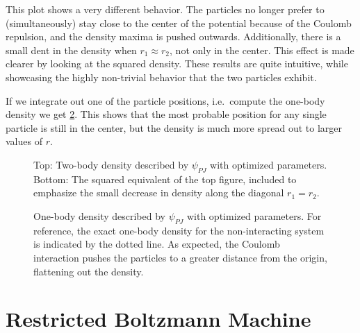 \documentclass[Thesis.tex]{subfiles}
\begin{document}
This plot shows a very different behavior. The particles no longer prefer to
(simultaneously) stay close to the center of the potential because of the Coulomb repulsion, and
the density maxima is pushed outwards. Additionally, there is a small dent in
the density when $r_1\approx r_2$, not only in the center. This effect is made
clearer by looking at the squared density. These results are quite intuitive,
while showcasing the highly non-trivial behavior that the two particles exhibit.

If we integrate out one of the particle positions, i.e.\ compute the one-body
density we get \cref{fig:QD-benchmark-pade-jastrow-onebody}. This shows that the
most probable position for any single particle is still in the center, but the
density is much more spread out to larger values of $r$.


\begin{figure}[h]
   \centering
    \resizebox{0.7\linewidth}{!}{%
        
    }
    \resizebox{0.7\linewidth}{!}{%
        
    }
    \caption[Two-body density using Pade-Jastrow wave function]{\label{fig:QD-benchmark-pade-jastrow-density}Top: Two-body density
      described by $\psi_{PJ}$ with optimized parameters. Bottom: The squared
      equivalent of the top figure, included to emphasize the small decrease in
      density along the diagonal $r_1=r_2$.}
\end{figure}

\begin{figure}[h]
   \centering
    \resizebox{0.7\linewidth}{!}{%
        
    }
    \caption[One-body density using Pade-Jastrow wave function]{\label{fig:QD-benchmark-pade-jastrow-onebody}One-body density
      described by $\psi_{PJ}$ with optimized parameters. For reference, the
      exact one-body density for the non-interacting system is indicated by the
      dotted line. As expected, the Coulomb interaction pushes the particles to
      a greater distance from the origin, flattening out the density. }
\end{figure}
\clearpage

\section{Restricted Boltzmann Machine}
\end{document}
